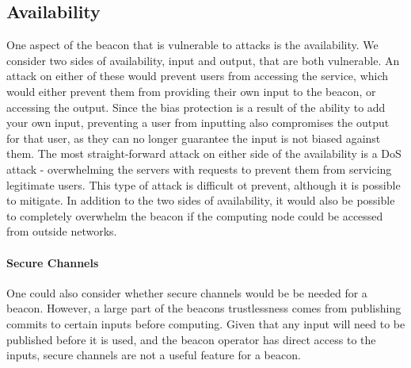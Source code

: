 \subsection{Availability}
One aspect of the beacon that is vulnerable to attacks is the availability. We consider two sides of availability, input and output, that are both vulnerable. An attack on either of these would prevent users from accessing the service, which would either prevent them from providing their own input to the beacon, or accessing the output. Since the bias protection is a result of the ability to add your own input, preventing a user from inputting also compromises the output for that user, as they can no longer guarantee the input is not biased against them. 
The most straight-forward attack on either side of the availability is a DoS attack - overwhelming the servers with requests to prevent them from servicing legitimate users. This type of attack is difficult ot prevent, although it is possible to mitigate. %
In addition to the two sides of availability, it would also be possible to completely overwhelm the beacon if the computing node could be accessed from outside networks. 

\paragraph{Secure Channels}
One could also consider whether secure channels would be be needed for a beacon. However, a large part of the beacons trustlessness comes from publishing commits to certain inputs before computing. Given that any input will need to be published before it is used, and the beacon operator has direct access to the inputs, secure channels are not a useful feature for a beacon. 